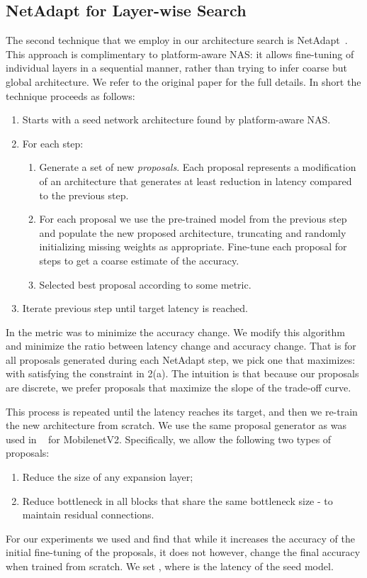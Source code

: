 \documentclass[10pt,twocolumn,letterpaper]{article}
\begin{document}
\subsection{NetAdapt for Layer-wise Search}
The second technique that we employ in our architecture search is NetAdapt~\cite{NetAdapt}. This 
approach is complimentary to platform-aware NAS: it allows fine-tuning of individual layers in a sequential manner,
rather than trying to infer coarse but global architecture. We refer to the original paper for the full details.
In short the technique proceeds as follows:
\begin{enumerate}[itemsep=0mm]
\item Starts with a seed network architecture found by platform-aware NAS. 
\item For each step: 
\begin{enumerate}[itemsep=0mm]
\item Generate a set of  new {\it proposals}. Each proposal
represents a modification of an architecture that generates at least  reduction in latency compared to the previous step.
\item For each proposal we use the pre-trained model from the  previous step and populate the new proposed architecture, truncating and randomly initializing missing
weights as appropriate. Fine-tune each proposal for  steps to get a coarse estimate of the accuracy.
\item  Selected best proposal according to some metric. 
\end{enumerate}
\item Iterate previous step until target latency is reached.
\end{enumerate}
 In \cite{NetAdapt} the metric was to minimize the accuracy change. 
We modify this algorithm and minimize the ratio between latency change and accuracy change. That is for all proposals generated during each NetAdapt step, we pick one that maximizes:    with  satisfying the constraint in 2(a). The intuition is that because our proposals are discrete, we prefer proposals that maximize the slope of the trade-off curve.

This process is repeated until the latency reaches its target,  and then we re-train the new architecture from scratch.
We use the same proposal generator as was used in ~\cite{NetAdapt} for MobilenetV2. Specifically, we allow the following two  types of proposals: 
\begin{enumerate}
    \item Reduce the size of any expansion layer;
    \item Reduce bottleneck in all blocks that share the same bottleneck size - to maintain residual connections.
\end{enumerate}
For our experiments we used  and find that while it increases the accuracy of the initial fine-tuning of the proposals, it does not however, change the final accuracy when trained from scratch. We set , where  is the latency of the seed model. 
\end{document}
